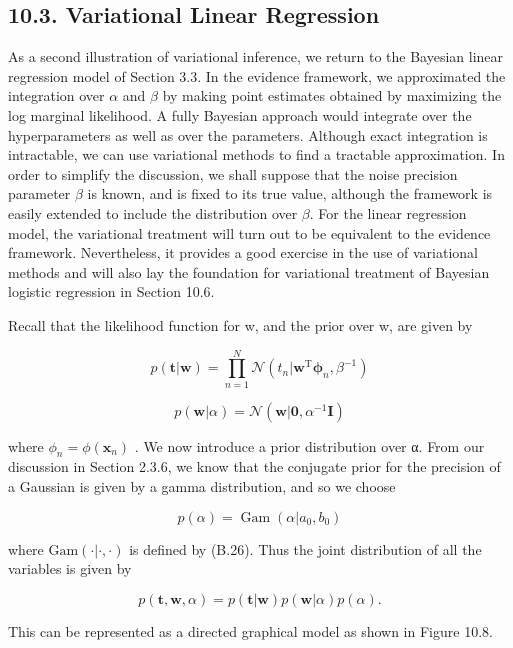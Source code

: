 \documentclass[
  10
]{article}
\begin{document}
\subsection{10.3. Variational Linear
Regression}\label{variational-linear-regression}

As a second illustration of variational inference, we return to the
Bayesian linear regression model of Section 3.3. In the evidence
framework, we approximated the integration over \(\alpha\) and \(\beta\)
by making point estimates obtained by maximizing the log marginal
likelihood. A fully Bayesian approach would integrate over the
hyperparameters as well as over the parameters. Although exact
integration is intractable, we can use variational methods to find a
tractable approximation. In order to simplify the discussion, we shall
suppose that the noise precision parameter \(\beta\) is known, and is
fixed to its true value, although the framework is easily extended to
include the distribution over \(\beta .\) For the linear regression
model, the variational treatment will turn out to be equivalent to the
evidence framework. Nevertheless, it provides a good exercise in the use
of variational methods and will also lay the foundation for variational
treatment of Bayesian logistic regression in Section 10.6.

Recall that the likelihood function for w, and the prior over w, are
given by

\[
p (\mathbf {t} | \mathbf {w}) = \prod_ {n = 1} ^ {N} \mathcal {N} (t _ {n} | \mathbf {w} ^ {\mathrm{T}} \boldsymbol {\phi} _ {n}, \beta^ {- 1})\tag{10.87}
\]

\[
{p (\mathbf {w} | \alpha)} = {\mathcal {N} (\mathbf {w} | \mathbf {0}, \alpha^ {- 1} \mathbf {I})}\tag{10.88}
\]

where \(\phi _ { n } = \phi ( \mathbf { x } _ { n } )\) . We now
introduce a prior distribution over α. From our discussion in Section
2.3.6, we know that the conjugate prior for the precision of a Gaussian
is given by a gamma distribution, and so we choose

\[
p (\alpha) = \operatorname{Gam} (\alpha | a _ {0}, b _ {0})\tag{10.89}
\]

where \(\mathrm { G a m } ( \cdot | \cdot , \cdot )\) is defined by
(B.26). Thus the joint distribution of all the variables is given by

\[
p (\mathbf {t}, \mathbf {w}, \alpha) = p (\mathbf {t} | \mathbf {w}) p (\mathbf {w} | \alpha) p (\alpha).\tag{10.90}
\]

This can be represented as a directed graphical model as shown in Figure
10.8.
\end{document}

